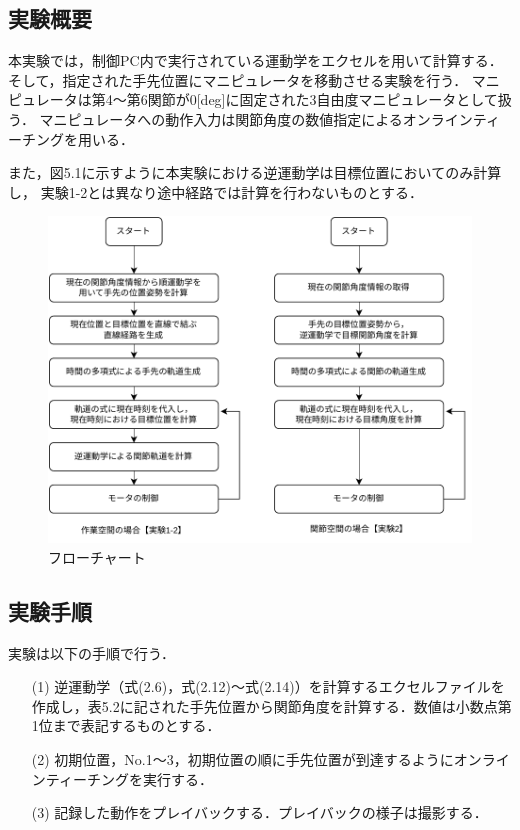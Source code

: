 \subsection{実験概要}
本実験では，制御PC内で実行されている運動学をエクセルを用いて計算する．
そして，指定された手先位置にマニピュレータを移動させる実験を行う．
マニピュレータは第4～第6関節が0[deg]に固定された3自由度マニピュレータとして扱う．
マニピュレータへの動作入力は関節角度の数値指定によるオンラインティーチングを用いる．

また，図5.1に示すように本実験における逆運動学は目標位置においてのみ計算し，
実験1-2とは異なり途中経路では計算を行わないものとする．

\begin{figure}[h]
  \centering
  \includegraphics[scale=0.75]{sozai/3.pdf}
  \caption{フローチャート}
\end{figure}

\newpage

\subsection{実験手順}
実験は以下の手順で行う．

\begin{enumerate}
  \item[(1)] 逆運動学（式(2.6)，式(2.12)～式(2.14)）を計算するエクセルファイルを作成し，表5.2に記された手先位置から関節角度を計算する．数値は小数点第1位まで表記するものとする．
  \item[(2)] 初期位置，No.1～3，初期位置の順に手先位置が到達するようにオンラインティーチングを実行する．
  \item[(3)] 記録した動作をプレイバックする．プレイバックの様子は撮影する．
\end{enumerate}

